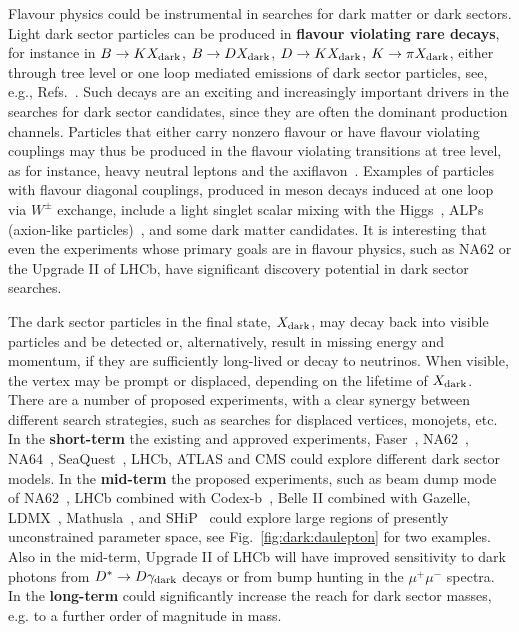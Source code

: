 


Flavour physics could be instrumental in searches for dark matter or dark sectors. Light dark sector particles can be produced in \textbf{flavour violating rare decays}, for instance in $B\to K X_{\rm dark}$, $B\to D X_{\rm dark}$, $D\to K X_{\rm dark}$, $K\to \pi X_{\rm dark}$, either through tree level or one loop mediated emissions of dark sector particles, see, e.g., Refs.~\cite{Bird:2004ts,Kamenik:2011vy}. Such decays are an exciting and increasingly important drivers in the searches for dark sector candidates, since they are often the dominant production channels. Particles that 
either carry nonzero flavour or have flavour violating couplings  may  thus be produced in the flavour violating transitions at tree level, as for instance, heavy neutral leptons \cite{Gorbunov:2007ak} and the  axiflavon~\cite{Calibbi:2016hwq,Ema:2016ops,Wilczek:1982rv}. 
Examples of particles with flavour diagonal couplings, produced in meson decays induced at one loop via $W^\pm$ exchange, include a light singlet scalar mixing with the Higgs~\cite{OConnell:2006rsp,Batell:2009jf,Winkler:2018qyg},  ALPs (axion-like particles)~\cite{Jaeckel:2010ni}, and some dark matter candidates. It is  interesting that even the experiments whose primary goals are in flavour physics, such as NA62 or the Upgrade II of LHCb, have significant discovery potential in dark sector searches. 

The dark sector particles in the final state, $X_{\rm dark}$, may decay back into visible particles and be detected or, alternatively, result in missing energy and momentum, if they are sufficiently long-lived
or decay to neutrinos. 
When visible, the vertex may be prompt or displaced, depending on the lifetime of $X_{\rm dark}$.   There are a number of proposed experiments, with a clear synergy between different search strategies, such as searches for displaced vertices, monojets, etc. In the {\bf short-term}  the existing and approved experiments, Faser~\cite{Feng:2017uoz}, NA62~\cite{Gonnella:2017hsz}, NA64~\cite{Banerjee:2016tad}, SeaQuest~\cite{Berlin:2018pwi}, LHCb, ATLAS and CMS could explore different dark sector models. In the {\bf mid-term} the proposed experiments, such as beam dump mode of NA62~\cite{Beacham:2019nyx}, LHCb combined with Codex-b~\cite{Gligorov:2017nwh}, Belle II combined with Gazelle, LDMX~\cite{Akesson:2018vlm}, Mathusla~\cite{Chou:2016lxi,Alpigiani:2018fgd}, and SHiP~\cite{Alekhin:2015byh}   could explore large regions of presently unconstrained parameter space, see Fig.~\ref{fig:dark:daulepton} for two examples. 
  Also in the mid-term, Upgrade II of LHCb will have improved sensitivity to dark photons from $D^*\to D\gamma_{\rm dark}$ decays or from bump hunting in the $\mu^+\mu^-$ spectra. In the {\bf long-term}  \FCCee  could significantly increase the reach for dark sector masses, e.g. to a further order of magnitude in mass. 

